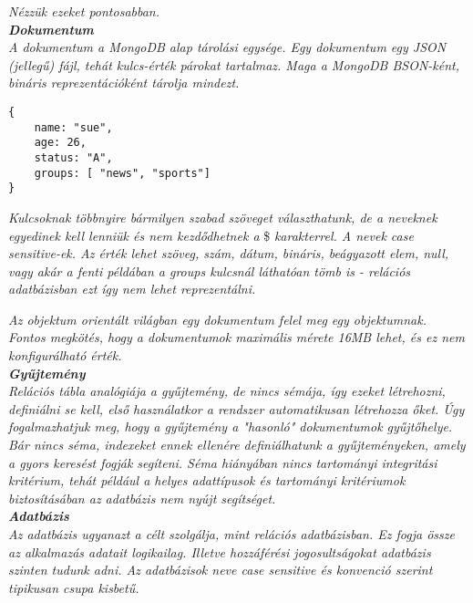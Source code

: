 \textit{Nézzük ezeket pontosabban.}\\

\noindent\textit{\textbf{Dokumentum}}\\

\textit{A dokumentum a MongoDB alap tárolási egysége. Egy dokumentum egy JSON (jellegű) fájl, tehát kulcs-érték párokat tartalmaz. Maga a MongoDB BSON-ként, bináris reprezentációként tárolja mindezt.}


\begin{verbatim}
{
    name: "sue",
    age: 26,
    status: "A",
    groups: [ "news", "sports"]
}
\end{verbatim}

\textit{Kulcsoknak többnyire bármilyen szabad szöveget választhatunk, de a neveknek egyedinek kell lenniük és nem kezdődhetnek a} \${} \textit{karakterrel. A nevek case sensitive-ek. Az érték lehet szöveg, szám, dátum, bináris, beágyazott elem, null, vagy akár a fenti példában a groups kulcsnál láthatóan tömb is - relációs adatbázisban ezt így nem lehet reprezentálni.}

\textit{Az objektum orientált világban egy dokumentum felel meg egy objektumnak. Fontos megkötés, hogy a dokumentumok maximális mérete 16MB lehet, és ez nem konfigurálható érték.}\\

\noindent\textit{\textbf{Gyűjtemény}}\\

\textit{Relációs tábla analógiája a gyűjtemény, de nincs sémája, így ezeket létrehozni, definiálni se kell, első használatkor a rendszer automatikusan létrehozza őket. Úgy fogalmazhatjuk meg, hogy a gyűjtemény a "hasonló" dokumentumok gyűjtőhelye. Bár nincs séma, indexeket ennek ellenére definiálhatunk a gyűjteményeken, amely a gyors keresést fogják segíteni. Séma hiányában nincs tartományi integritási kritérium, tehát például a helyes adattípusok és tartományi kritériumok biztosításában az adatbázis nem nyújt segítséget.}\\

\noindent\textit{\textbf{Adatbázis}}\\

\textit{Az adatbázis ugyanazt a célt szolgálja, mint relációs adatbázisban. Ez fogja össze az alkalmazás adatait logikailag. Illetve hozzáférési jogosultságokat adatbázis szinten tudunk adni. Az adatbázisok neve case sensitive és konvenció szerint tipikusan csupa kisbetű.}\\

